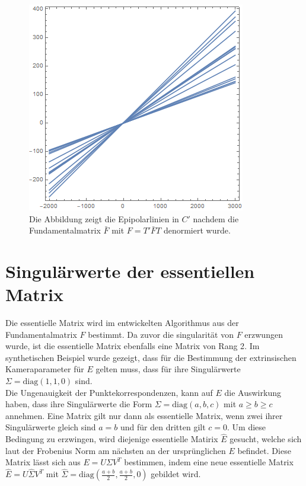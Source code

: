 \begin{figure}[!htb]
	\includegraphics[width=\linewidth]{images/LPrime_PC2_F_Constraint_denormalized.png}
	\caption[Epipolarlinien in $C$ aus singulärer denormierter Fundamentalmatrix]{Die Abbildung zeigt die Epipolarlinien in $C'$ nachdem die Fundamentalmatrix $\bar{F}$ mit $F = T'\bar{F}T$ denormiert wurde.}
	\label{fig:EpipoleWithF2Denorm}
	\endminipage\hfill
\end{figure}

\pagebreak

\section{Singulärwerte der essentiellen Matrix}

Die essentielle Matrix wird im entwickelten Algorithmus aus der Fundamentalmatrix $F$ bestimmt. Da zuvor die singularität von $F$ erzwungen wurde, ist die essentielle Matrix ebenfalls eine Matrix von Rang 2\cite{HZ}. Im synthetischen Beispiel wurde gezeigt, dass für die Bestimmung der extrinsischen Kameraparameter für $E$ gelten muss, dass für ihre Singulärwerte $\Sigma = \text{diag}(1,1,0)$ sind. \\

Die Ungenauigkeit der Punktekorrespondenzen, kann auf $E$ die Auswirkung haben, dass ihre Singulärwerte die Form $\Sigma = \text{diag}(a,b,c)$ mit $a \geq b \geq c$ annehmen. Eine Matrix gilt nur dann als essentielle Matrix, wenn zwei ihrer Singulärwerte gleich sind $a = b$ und für den dritten gilt $c=0$. Um diese Bedingung zu erzwingen, wird diejenige essentielle Matirix $\hat{E}$ gesucht, welche sich laut der Frobenius Norm am nächsten an der ursprünglichen $E$ befindet\cite{HZ,Ferid}. Diese Matrix lässt sich aus $E = U \Sigma V^T$ bestimmen, indem eine neue essentielle Matrix $\hat{E} = U \hat{\Sigma}V^T$ mit $\hat{\Sigma} = \text{diag}(\frac{a+b}{2},\frac{a+b}{2},0)$\cite{HZ} gebildet wird.\\

